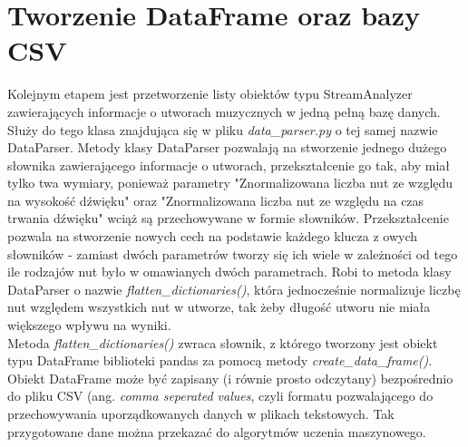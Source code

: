 \documentclass[printmode, eng, openany]{mgr}
\newcommand\tab[1][1cm]{\hspace*{#1}}
\begin{document}
\section{Tworzenie DataFrame oraz bazy CSV}
\tab Kolejnym etapem jest przetworzenie listy obiektów typu StreamAnalyzer zawierających informacje o utworach muzycznych w jedną pełną bazę danych. Służy do tego klasa znajdująca się w pliku \textit{data\_parser.py} o tej samej nazwie DataParser. Metody klasy DataParser pozwalają na stworzenie jednego dużego słownika zawierającego informacje o utworach, przekształcenie go tak, aby miał tylko twa wymiary, ponieważ parametry "Znormalizowana liczba nut ze względu na wysokość dźwięku" oraz "Znormalizowana liczba nut ze względu na czas trwania dźwięku" wciąż są przechowywane w formie słowników. Przekształcenie pozwala na stworzenie nowych cech na podstawie każdego klucza z owych słowników - zamiast dwóch parametrów tworzy się ich wiele w zależności od tego ile rodzajów nut było w omawianych dwóch parametrach. Robi to metoda klasy DataParser o nazwie \textit{flatten\_dictionaries()}, która jednocześnie normalizuje liczbę nut względem wszystkich nut w utworze, tak żeby długość utworu nie miała większego wpływu na wyniki.\\
\tab Metoda \textit{flatten\_dictionaries()} zwraca słownik, z którego tworzony jest obiekt typu DataFrame biblioteki pandas za pomocą metody \textit{create\_data\_frame()}. Obiekt DataFrame może być zapisany (i równie prosto odczytany) bezpośrednio do pliku CSV (ang. \textit{comma seperated values}, czyli formatu pozwalającego do przechowywania uporządkowanych danych w plikach tekstowych. Tak przygotowane dane można przekazać do algorytmów uczenia maszynowego.
\end{document}
